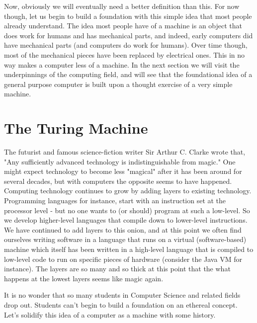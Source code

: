 \documentclass[11pt,fleqn]{book} %
\begin{document}
Now, obviously we will eventually need a better definition than this.  For now though, let us begin to build a foundation with this simple idea that most people already understand.  The idea most people have of a machine is an object that does work for humans and has mechanical parts, and indeed, early computers did have mechanical parts (and computers do work for humans).  Over time though, most of the mechanical pieces have been replaced by electrical ones.  This in no way makes a computer less of a machine.  In the next section we will visit the underpinnings of the computing field, and will see that the foundational idea of a general purpose computer is built upon a thought exercise of a very simple machine.

\section{The Turing Machine}

The futurist and famous science-fiction writer Sir Arthur C. Clarke wrote that, "Any sufficiently advanced technology is indistinguishable from magic."  One might expect technology to become less "magical" after it has been around for several decades, but with computers the opposite seems to have happened.  Computing technology continues to grow by adding layers to existing technology.  Programming languages for instance, start with an instruction set at the processor level - but no one wants to (or should) program at such a low-level.  So we develop higher-level languages that compile down to lower-level instructions. We have continued to add layers to this onion, and at this point we often find ourselves writing software in a language that runs on a virtual (software-based) machine which itself has been written in a high-level language that is compiled to low-level code to run on specific pieces of hardware (consider the Java VM for instance).  The layers are so many and so thick at this point that the what happens at the lowest layers seems like magic again. 

It is no wonder that so many students in Computer Science and related fields drop out.  Students can't begin to build a foundation on an ethereal concept.  Let's solidify this idea of a computer as a machine with some history.
\end{document}
